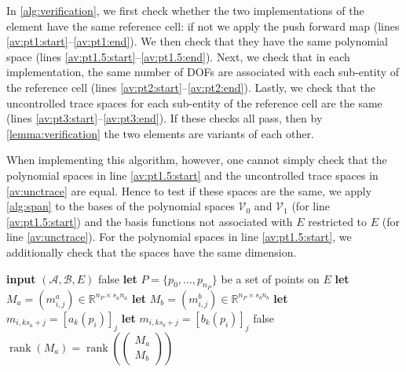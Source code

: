 \documentclass[sn-mathphys-num]{sn-jnl}%
\theoremstyle{thmstyleone}%
\newcommand{\subentity}{E}
\newcommand{\polyspace}{\mathcal{V}}
\theoremstyle{thmstyletwo}%
\theoremstyle{thmstylethree}%
\begin{document}
In \cref{alg:verification}, we first check whether the two implementations of the element have
the same reference cell: if not we apply the push forward map
(lines \ref{av:pt1:start}--\ref{av:pt1:end}). We then check that they
have the same polynomial space
(lines \ref{av:pt1.5:start}--\ref{av:pt1.5:end}).
Next, we check that in each implementation, the same number of DOFs are associated with each sub-entity
of the reference cell
(lines \ref{av:pt2:start}--\ref{av:pt2:end}).
Lastly, we check that the uncontrolled trace spaces for each sub-entity of the reference cell are the same
(lines \ref{av:pt3:start}--\ref{av:pt3:end}).
If these checks all pass, then by \cref{lemma:verification} the two elements are variants of each other.

When implementing this algorithm, however, one cannot simply check that the polynomial spaces in
line \ref{av:pt1.5:start} and the uncontrolled trace spaces in \ref{av:unctrace} are equal. Hence to
test if these spaces are the same, we apply \cref{alg:span} to
the bases of the polynomial spaces $\polyspace_0$ and $\polyspace_1$ (for line \ref{av:pt1.5:start})
and the basis functions not associated with $E$ restricted to $E$ (for line \ref{av:unctrace}).
For the polynomial spaces in line \ref{av:pt1.5:start}, we additionally check that the spaces have the
same dimension.

\begin{algorithm}
\caption{Checking if two sets of functions $\mathcal{A}=\{a_0,\dots,a_{n_a-1}\}$
and $\mathcal{B}=\{b_0,\dots,b_{n_b-1}\}$ span the same space on the entity $\subentity$. In this algorithm,
$s_a$ and $s_b$ are the value sizes of the functions in $\mathcal{A}$ and $\mathcal{B}$
and
$\left[f\right]_k$ is equal to $f$ if $f$ is a scalar-valued function, or the $k$th component of $f$ is $f$ is vector- or tensor-valued.
}\label{alg:span}
\newcommand{\VARIABLE}[1]{\texttt{#1}}
\newcommand{\LET}{\textbf{let }}
\newcommand{\INPUT}{\textbf{input }}
\begin{algorithmic}[1]
\STATE \INPUT $(\mathcal{A},\mathcal{B},E)$
 \label{as:pt1:start}
\RETURN false
\ENDIF\label{as:pt1:end}
\STATE \LET $P=\{p_0,\dots,p_{n_P}\}$ be a set of points on $\subentity$\label{as:let-p}
\STATE \LET $M_a=(m^a_{i,j})\in\mathbb{R}^{n_P\times s_an_a}$\label{as:pt2:start}
\STATE \LET $M_b=(m^b_{i,j})\in\mathbb{R}^{n_P\times s_bn_b}$
\STATE \LET $m_{i,ks_a+j} = \left[a_k(p_i)\right]_j$
\ENDFOR
{}
\STATE \LET $m_{i,ks_b+j} = \left[b_k(p_i)\right]_j$
\ENDFOR
\ENDFOR
\ENDFOR\label{as:pt2:end}
\label{as:pt3:start}
\RETURN false
\ENDIF\label{as:pt3:end}
\RETURN $\operatorname{rank}(M_a)=\operatorname{rank}\left(\begin{pmatrix}M_a\\M_b\end{pmatrix}\right)$\label{as:pt4}
\end{algorithmic}
\end{algorithm}
\end{document}
